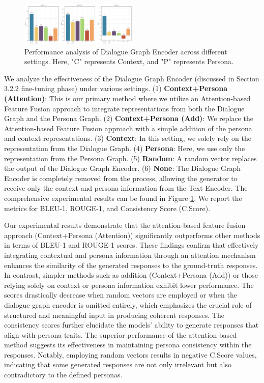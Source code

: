 \documentclass[letterpaper]{article} %
\begin{document}
\begin{figure}[ht]
    \centering
    \includegraphics[width=0.5\textwidth]{./images/effectiveness_of_dialogue_graph_encoder.png}
    \caption{Performance analysis of Dialogue Graph Encoder across different settings. Here, "C" represents Context, and "P" represents Persona.}
    \label{fig:effectiveness_of_dialogue_graph_encoder}
\end{figure}

We analyze the effectiveness of the Dialogue Graph Encoder (discussed in Section 3.2.2 fine-tuning phase) under various settings. (1) \textbf{Context+Persona (Attention)}: This is our primary method where we utilize an Attention-based Feature Fusion approach to integrate representations from both the Dialogue Graph and the Persona Graph. (2) \textbf{Context+Persona (Add)}: We replace the Attention-based Feature Fusion approach with a simple addition of the persona and context representations. (3) \textbf{Context}: In this setting, we solely rely on the representation from the Dialogue Graph. (4) \textbf{Persona}: Here, we use only the representation from the Persona Graph. (5) \textbf{Random}: A random vector replaces the output of the Dialogue Graph Encoder. (6) \textbf{None}: The Dialogue Graph Encoder is completely removed from the process, allowing the generator to receive only the context and persona information from the Text Encoder. The comprehensive experimental results can be found in Figure \ref{fig:effectiveness_of_dialogue_graph_encoder}. We report the metrics for BLEU-1, ROUGE-1, and Consistency Score (C.Score).

Our experimental results demonstrate that the attention-based feature fusion approach (Context+Persona (Attention)) significantly outperforms other methods in terms of BLEU-1 and ROUGE-1 scores. These findings confirm that effectively integrating contextual and persona information through an attention mechanism enhances the similarity of the generated responses to the ground-truth responses. In contrast, simpler methods such as addition (Context+Persona (Add)) or those relying solely on context or persona information exhibit lower performance. The scores drastically decrease when random vectors are employed or when the dialogue graph encoder is omitted entirely, which emphasizes the crucial role of structured and meaningful input in producing coherent responses. The consistency scores further elucidate the models' ability to generate responses that align with persona traits. The superior performance of the attention-based method suggests its effectiveness in maintaining persona consistency within the responses. Notably, employing random vectors results in negative C.Score values, indicating that some generated responses are not only irrelevant but also contradictory to the defined personas.
\end{document}
